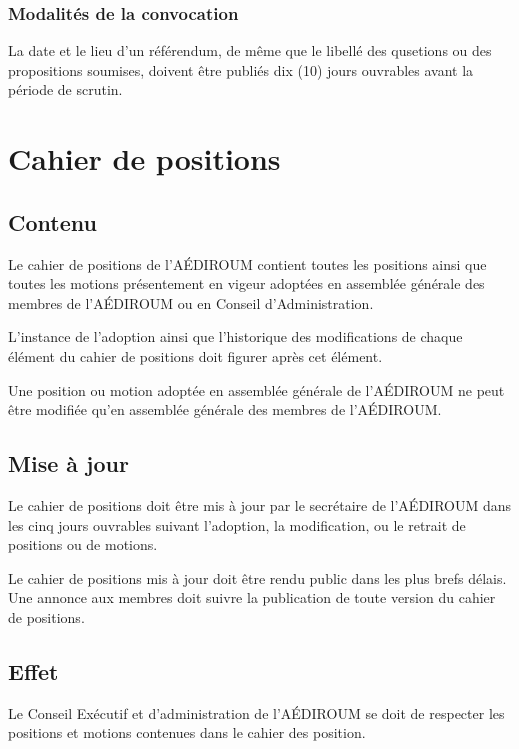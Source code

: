 \documentclass{aediroum}
\begin{document}
\subsubsection{Modalités de la convocation}\label{sec:modalites-convocation}

La date et le lieu d'un référendum, de même que le libellé des qusetions ou des propositions soumises, doivent être publiés dix (10) jours ouvrables avant la période de scrutin.

\section{Cahier de positions}\label{sec:cahier-de-positions}

\subsection{Contenu}\label{sec:contenu-positions}

Le cahier de positions de l'AÉDIROUM contient toutes les positions ainsi que toutes les motions présentement en vigeur adoptées en assemblée générale des membres de l'AÉDIROUM ou en Conseil d'Administration.

L'instance de l'adoption ainsi que l'historique des modifications de chaque élément du cahier de positions doit figurer après cet élément.

Une position ou motion adoptée en assemblée générale de l'AÉDIROUM ne peut être modifiée qu'en assemblée générale des membres de l'AÉDIROUM.

\subsection{Mise à jour}\label{sec:mise-a-jour-positions}

Le cahier de positions doit être mis à jour par le secrétaire de l'AÉDIROUM dans les cinq jours ouvrables suivant l'adoption, la modification, ou le retrait de positions ou de motions.

Le cahier de positions mis à jour doit être rendu public dans les plus brefs délais. Une annonce aux membres doit suivre la publication de toute version du cahier de positions.

\subsection{Effet}\label{sec:effet-positions}

Le Conseil Exécutif et d'administration de l'AÉDIROUM se doit de respecter les positions et motions contenues dans le cahier des position.
\end{document}

